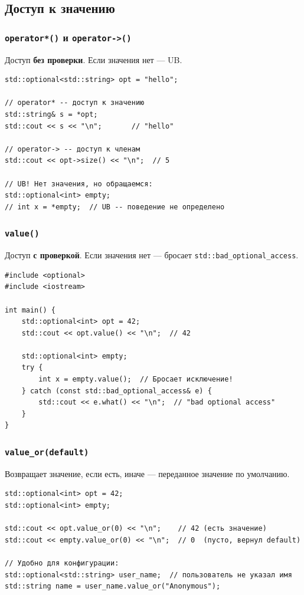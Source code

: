 \documentclass[a4paper,12pt]{article}
\begin{document}
\subsection{Доступ к значению}

\subsubsection{\texttt{operator*()} и \texttt{operator->()}}

Доступ \textbf{без проверки}. Если значения нет --- UB.

\begin{lstlisting}
std::optional<std::string> opt = "hello";

// operator* -- доступ к значению
std::string& s = *opt;
std::cout << s << "\n";       // "hello"

// operator-> -- доступ к членам
std::cout << opt->size() << "\n";  // 5

// UB! Нет значения, но обращаемся:
std::optional<int> empty;
// int x = *empty;  // UB -- поведение не определено
\end{lstlisting}

\subsubsection{\texttt{value()}}

Доступ \textbf{с проверкой}. Если значения нет --- бросает \texttt{std::bad\_optional\_access}.

\begin{lstlisting}
#include <optional>
#include <iostream>

int main() {
    std::optional<int> opt = 42;
    std::cout << opt.value() << "\n";  // 42

    std::optional<int> empty;
    try {
        int x = empty.value();  // Бросает исключение!
    } catch (const std::bad_optional_access& e) {
        std::cout << e.what() << "\n";  // "bad optional access"
    }
}
\end{lstlisting}

\subsubsection{\texttt{value\_or(default)}}

Возвращает значение, если есть, иначе --- переданное значение по умолчанию.

\begin{lstlisting}
std::optional<int> opt = 42;
std::optional<int> empty;

std::cout << opt.value_or(0) << "\n";    // 42 (есть значение)
std::cout << empty.value_or(0) << "\n";  // 0  (пусто, вернул default)

// Удобно для конфигурации:
std::optional<std::string> user_name;  // пользователь не указал имя
std::string name = user_name.value_or("Anonymous");
\end{lstlisting}
\end{document}

